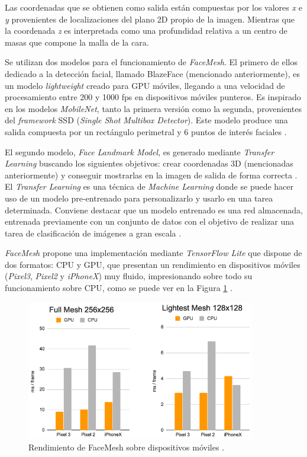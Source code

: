 Las coordenadas que se obtienen como salida están compuestas por los valores \textit{x} e \textit{y} provenientes de localizaciones del plano 2D propio de la imagen. Mientras que la coordenada \textit{z} es interpretada como una profundidad relativa a un centro de masas que compone la malla de la cara.

Se utilizan dos modelos para el funcionamiento de \textit{FaceMesh}. El primero de ellos dedicado a la detección facial, llamado BlazeFace (mencionado anteriormente), es un modelo \textit{lightweight} creado para GPU móviles, llegando a una velocidad de procesamiento entre 200 y 1000 fps en dispositivos móviles punteros. Es inspirado en los modelos \textit{MobileNet}, tanto la primera versión como la segunda, provenientes del \textit{framework} SSD (\textit{Single Shot Multibox Detector}). Este modelo produce una salida compuesta por un rectángulo perimetral y 6 puntos de interés faciales \cite{blazeface}.

El segundo modelo, \textit{Face Landmark Model}, es generado mediante \textit{Transfer Learning} buscando los siguientes objetivos: crear coordenadas 3D (mencionadas anteriormente) y conseguir mostrarlas en la imagen de salida de forma correcta \cite{faceMesh}. El \textit{Transfer Learning} es una técnica de \textit{Machine Learning} donde se puede hacer uso de un modelo pre-entrenado para personalizarlo y usarlo en una tarea determinada. Conviene destacar que un modelo entrenado es una red almacenada, entrenada previamente con un conjunto de datos con el objetivo de realizar una tarea de clasificación de imágenes a gran escala \cite{transferLearning}.

\textit{FaceMesh} propone una implementación mediante \textit{TensorFlow Lite} que dispone de dos formatos: CPU y GPU, que presentan un rendimiento en dispositivos móviles (\textit{Pixel3}, \textit{Pixel2} y \textit{iPhoneX}) muy fluido, impresionando sobre todo su funcionamiento sobre CPU, como se puede ver en la Figura \ref{fig:faceMeshRen} \cite{faceMesh3}.

\begin{figure}[htp]
	\centering
	\includegraphics[width=10cm]{imagenes/rendFaceMesh.png}
	\caption[Rendimiento de FaceMesh sobre dispositivos móviles.]{Rendimiento de FaceMesh sobre dispositivos móviles \cite{faceMesh3}.}
	\label{fig:faceMeshRen}
\end{figure}

